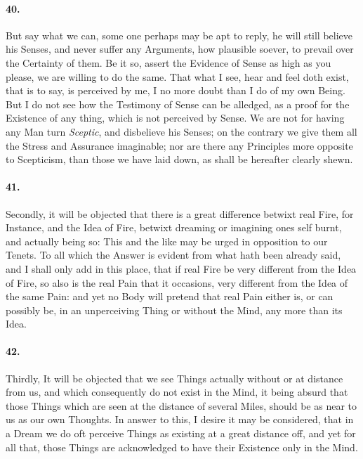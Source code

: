 \documentclass[]{article}
\newenvironment{sectionbody}{\begin{multicols}{2}}{\end{multicols}}
\begin{document}
\begin{sectionbody}
\paragraph{40.} But say what we can, some one perhaps may be apt to reply, he
will still believe his Senses, and never suffer any Arguments,
how plausible soever, to prevail over the Certainty of them.  Be
it so, assert the Evidence of Sense as high as you please, we are
willing to do the same.  That what I see, hear and feel doth
exist, that is to say, is perceived by me, I no more doubt than I
do of my own Being.  But I do not see how the Testimony of Sense
can be alledged, as a proof for the Existence of any thing, which
is not perceived by Sense.  We are not for having any Man turn
\emph{Sceptic}, and disbelieve his Senses; on the contrary we
give them all the Stress and Assurance imaginable; nor are there
any Principles more opposite to Scepticism, than those we have
laid down, as shall be hereafter clearly shewn.



\paragraph{41.} Secondly, it will be objected that there is a great difference
betwixt real Fire, for Instance, and the Idea of Fire, betwixt
dreaming or imagining ones self burnt, and actually being so:
This and the like may be urged in opposition to our Tenets.  To
all which the Answer is evident from what hath been already said,
and I shall only add in this place, that if real Fire be very
different from the Idea of Fire, so also is the real Pain that it
occasions, very different from the Idea of the same Pain: and yet
no Body will pretend that real Pain either is, or can possibly
be, in an unperceiving Thing or without the Mind, any more than
its Idea.



\paragraph{42.} Thirdly, It will be objected that we see Things actually without
or at distance from us, and which consequently do not exist in
the Mind, it being absurd that those Things which are seen at the
distance of several Miles, should be as near to us as our own
Thoughts.  In answer to this, I desire it may be considered, that
in a Dream we do oft perceive Things as existing at a great
distance off, and yet for all that, those Things are acknowledged
to have their Existence only in the Mind.




\end{sectionbody}
\end{document}
